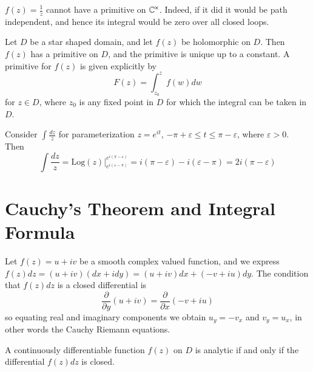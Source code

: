\begin{remark}
    $f(z) = \frac{1}{z}$ cannot have a primitive on $\mathbb C^{\times}$. Indeed, if it did it would be path independent, and hence its integral would be zero over all closed loops.
\end{remark}

\begin{theorem}
    Let $D$ be a star shaped domain, and let $f(z)$ be holomorphic on $D$. Then $f(z)$ has a primitive on $D$, and the primitive is unique up to a constant. A primitive for $f(z)$ is given explicitly by \begin{equation*}
        F(z) = \int_{z_0}^{z}f(w)dw
    \end{equation*}
    for $z \in D$, where $z_0$ is any fixed point in $D$ for which the integral can be taken in $D$.
\end{theorem}


\begin{example}
    Consider $\int \frac{dz}{z}$ for parameterization $z = e^{it}$, $-\pi + \varepsilon \leq t \leq \pi - \varepsilon$, where $\varepsilon > 0$. Then \begin{equation*}
        \int\frac{dz}{z} = \text{Log}(z)\vert_{e^{i(\varepsilon-\pi)}}^{e^{i(\pi-\varepsilon)}} = i(\pi-\varepsilon) - i(\varepsilon - \pi) = 2i(\pi-\varepsilon)
    \end{equation*}
\end{example}


\section{Cauchy's Theorem and Integral Formula}


Let $f(z) = u+iv$ be a smooth complex valued function, and we express $f(z)dz = (u+iv)(dx+idy) = (u+iv)dx+(-v+iu)dy$. The condition that $f(z)dz$ is a closed differential is \begin{equation*}
    \frac{\partial}{\partial y}(u+iv) = \frac{\partial}{\partial x}(-v+iu)
\end{equation*}
so equating real and imaginary components we obtain $u_y = -v_x$ and $v_y = u_x$, in other words the Cauchy Riemann equations. 

\begin{theorem}
    A continuously differentiable function $f(z)$ on $D$ is analytic if and only if the differential $f(z)dz$ is closed.
\end{theorem}

